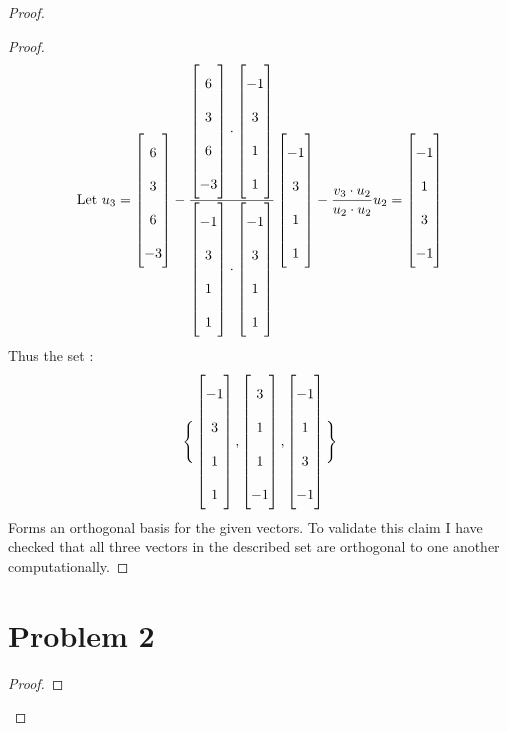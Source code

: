 \documentclass[12pt]{article}
\newcommand{\sect}[1]{\section*{#1}}
\begin{document}
\begin{proof}
\begin{proof}
    \[
    \text{Let } u_3=\begin{bmatrix}
        6\\3\\6\\-3
    \end{bmatrix}-\frac{{\begin{bmatrix}
      6\\3\\6\\-3
    \end{bmatrix}\cdot  \begin{bmatrix}
        -1\\3\\1\\1
    \end{bmatrix}}}{\begin{bmatrix}
          -1\\3\\1\\1
      \end{bmatrix}\cdot \begin{bmatrix}
            -1\\3\\1\\1
        \end{bmatrix}}\begin{bmatrix}
              -1\\3\\1\\1
          \end{bmatrix}-\frac{v_3\cdot u_2}{u_2 \cdot u_2}u_2=  \renewcommand\arraystretch{2}\begin{bmatrix}
          -1\\\-1\\3\\-1
        \end{bmatrix}
    \]
    Thus the set :
    \[
      \Bigg\{\begin{bmatrix}
        -1\\3\\1\\1
    \end{bmatrix},\begin{bmatrix}
      3\\1\\1\\-1
    \end{bmatrix},\renewcommand\arraystretch{2}\begin{bmatrix}
      -1\\\-1\\3\\-1
  \end{bmatrix}\Bigg\}
    \]
    Forms an orthogonal basis for the given vectors. To validate this claim I have checked that all three vectors in the described set are orthogonal to one another computationally.
  \end{proof}
\sect{Problem 2}
\begin{proof}


\end{proof}
\end{proof}
\end{document}
